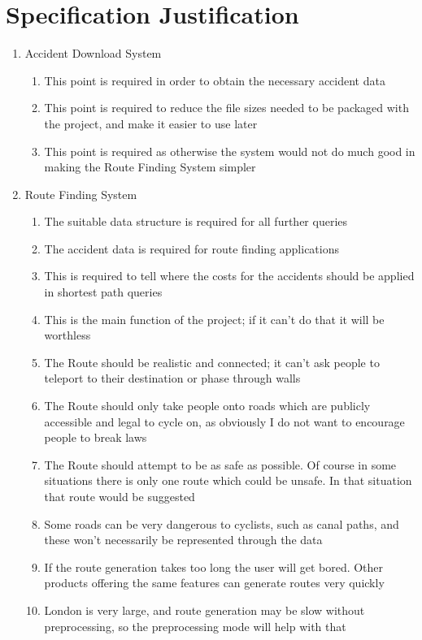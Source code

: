 \documentclass[11pt,twoside,a4paper]{report}
\begin{document}
\section{Specification Justification}
\begin{enumerate}
    \item Accident Download System
    \begin{enumerate}
        \item This point is required in order to obtain the necessary accident data
        \item This point is required to reduce the file sizes needed to be packaged with the project, and make it easier to use later
        \item This point is required as otherwise the system would not do much good in making the Route Finding System simpler
    \end{enumerate} 
    \item Route Finding System
    \begin{enumerate}
        \item The suitable data structure is required for all further queries
        \item The accident data is required for route finding applications
        \item This is required to tell where the costs for the accidents should be applied in shortest path queries
        \item This is the main function of the project; if it can't do that it will be worthless
        \item The Route should be realistic and connected; it can't ask people to teleport to their destination or phase through walls
        \item The Route should only take people onto roads which are publicly accessible and legal to cycle on, as obviously I do not want to encourage people to break laws
        \item The Route should attempt to be as safe as possible. Of course in some situations there is only one route which could be unsafe. In that situation that route would be suggested
        \item Some roads can be very dangerous to cyclists, such as canal paths, and these won't necessarily be represented through the data
        \item If the route generation takes too long the user will get bored. Other products offering the same features can generate routes very quickly
        \item London is very large, and route generation may be slow without preprocessing, so the preprocessing mode will help with that

\end{enumerate}
\end{enumerate}
\end{document}
